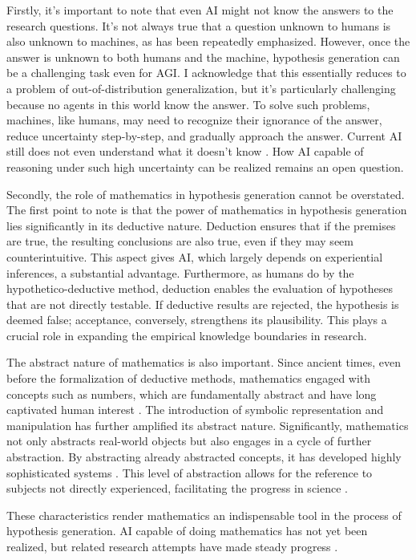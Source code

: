\documentclass{article}
\begin{document}
Firstly, it's important to note that even AI might not know the answers to the research questions. It's not always true that a question unknown to humans is also unknown to machines, as has been repeatedly emphasized. However, once the answer is unknown to both humans and the machine, hypothesis generation can be a challenging task even for AGI. I acknowledge that this essentially  reduces to a problem of out-of-distribution generalization, but it's particularly challenging because no agents in this world know the answer. To solve such problems, machines, like humans, may need to recognize their ignorance of the answer, reduce uncertainty step-by-step, and gradually approach the answer. Current AI still does not even understand what it doesn't know \cite{guo2017calibration,maynez2020faithfulness}. How AI capable of reasoning under such high uncertainty can be realized remains an open question.

Secondly, the role of mathematics in hypothesis generation cannot be overstated. The first point to note is that the power of mathematics in hypothesis generation lies significantly in its deductive nature. Deduction ensures that if the premises are true, the resulting conclusions are also true, even if they may seem counterintuitive. This aspect gives AI, which largely depends on experiential inferences, a substantial advantage. Furthermore, as humans do by the hypothetico-deductive method, deduction enables the evaluation of hypotheses that are not directly testable. If deductive results are rejected, the hypothesis is deemed false; acceptance, conversely, strengthens its plausibility. This plays a crucial role in expanding the empirical knowledge boundaries in research. 

The abstract nature of mathematics is also important. Since ancient times, even before the formalization of deductive methods, mathematics engaged with concepts such as numbers, which are fundamentally abstract and have long captivated human interest \cite{david2010history}. The introduction of symbolic representation and manipulation has further amplified its abstract nature. Significantly, mathematics not only abstracts real-world objects but also engages in a cycle of further abstraction. By abstracting already abstracted concepts, it has developed highly sophisticated systems \cite{bochner1968role}. This level of abstraction allows for the reference to subjects not directly experienced, facilitating the progress in science \cite{heisenberg2008abstraction}. 

These characteristics render mathematics an indispensable tool in the process of hypothesis generation. AI capable of doing mathematics has not yet been realized, but related research attempts have made steady progress \cite{rabe2021towards,imani2023mathprompter}.
\end{document}
